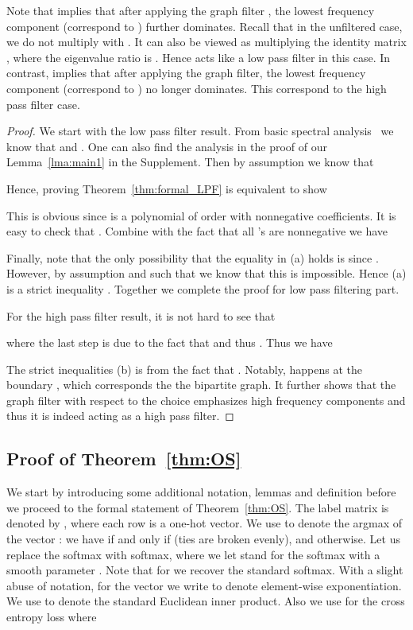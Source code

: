 \documentclass{article} \usepackage{iclr2021_conference,times}
\begin{document}
Note that  implies that after applying the graph filter , the lowest frequency component (correspond to ) further dominates. Recall that in the unfiltered case, we do not multiply with . It can also be viewed as multiplying the identity matrix , where the eigenvalue ratio is . 
Hence  acts like a low pass filter in this case. In contrast,  implies that after applying the graph filter, the lowest frequency component (correspond to ) no longer dominates. This correspond to the high pass filter case.

\begin{proof}
 We start with the low pass filter result. From basic spectral analysis~\citep{von2007tutorial} we know that  and . One can also find the analysis in the proof of our Lemma~\ref{lma:main1} in the Supplement. Then by assumption we know that

Hence, proving Theorem~\ref{thm:formal_LPF} is equivalent to show

This is obvious since  is a polynomial of order  with nonnegative coefficients. It is easy to check that . Combine with the fact that all 's are nonnegative we have

Finally, note that the only possibility that the equality in (a) holds is  since . However, by assumption  and  such that  we know that this is impossible. Hence (a) is a strict inequality . Together we complete the proof for low pass filtering part.

For the high pass filter result, it is not hard to see that

where the last step is due to the fact that  and thus . Thus we have

The strict inequalities (b) is from the fact that . Notably,  happens at the boundary , which corresponds the the bipartite graph. It further shows that the graph filter with respect to the choice  emphasizes high frequency components and thus it is indeed acting as a high pass filter.
\end{proof}

\subsection{Proof of Theorem~\ref{thm:OS}}
We start by introducing some additional notation, lemmas and definition before we proceed to the formal statement of Theorem~\ref{thm:OS}. The label matrix is denoted by , where each row is a one-hot vector. We use  to denote the argmax of the vector : we have  if and only if  (ties are broken evenly), and  otherwise. Let us replace the softmax with softmax, where we let  stand for the softmax with a smooth parameter . Note that for  we recover the standard softmax. With a slight abuse of notation, for the vector  we write  to denote element-wise exponentiation. We use  to denote the standard Euclidean inner product. Also we use  for the cross entropy loss where
\end{document}
